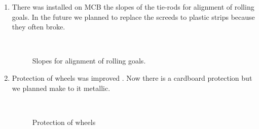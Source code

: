 \begin{enumerate}
	\item There was installed on MCB the slopes of the tie-rods for alignment of rolling goals. In the future we planned to replace the screeds  to plastic strips because they often broke.
	
	\begin{figure}[H]
		\begin{minipage}[h]{0.2\linewidth}
			\center  
		\end{minipage}
		\begin{minipage}[h]{0.6\linewidth}
			\caption {Slopes for alignment of rolling goals.}
		\end{minipage}
	\end{figure}
	
	\item Protection of wheels was improved . Now there is a cardboard protection but we planned make to it metallic.
	
	\begin{figure}[H]
		\begin{minipage}[h]{0.2\linewidth}
			\center  
		\end{minipage}
		\begin{minipage}[h]{0.6\linewidth}
			\caption{Protection of wheels}
		\end{minipage}
	\end{figure}
	

\end{enumerate}
